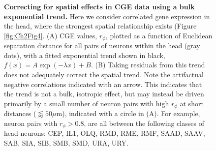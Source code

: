 \begin{figure}[h!]
 \caption{{\bf Correcting for spatial effects in CGE data using a bulk exponential trend.}
  Here we consider correlated gene expression in the head, where the strongest spatial relationship exists (Figure \ref{fig:Ch2Fig4}. (A) CGE values, $r_\phi$, plotted as a function of Euclidean separation distance for all pairs of neurons within the head (gray dots), with a fitted exponential trend shown in black, $f(x) = A\exp(-\lambda x) + B$.
(B) Taking residuals from this trend does not adequately correct the spatial trend.
    Note the artifactual negative correlations indicated with an arrow.
    This indicates that the trend is not a bulk, isotropic effect, but may instead be driven primarily by a small number of neuron pairs with high $r_\phi$ at short distances ($\lessapprox 50\mu$m), indicated with a circle in (A).
For example, neuron pairs with $r_\phi > 0.8$, are all between the following classes of head neurons: CEP, IL1, OLQ, RMD, RME, RMF, SAAD, SAAV, SAB, SIA, SIB, SMB, SMD, URA, URY.}
\label{fig:Ch2S4_Fig}
\end{figure}


